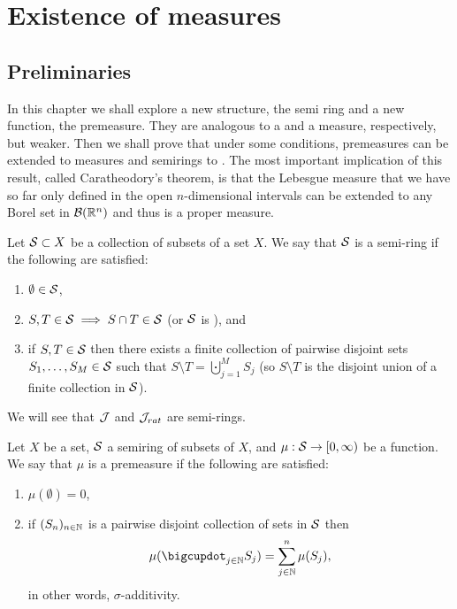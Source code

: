
\chapter{Existence of measures}

\section{Preliminaries}

In this chapter we shall explore a new structure, the semi ring and a new function, the premeasure. They are analogous to a \siga and a measure, respectively, but weaker. Then we shall prove that under some conditions, premeasures can be extended to measures and semirings to \sigas. The most important implication of this result, called Caratheodory's theorem, is that the Lebesgue measure that we have so far only defined in the open $n$-dimensional intervals can be extended to any Borel set in $\mathcal{B}(\mathbb{R}^n)$ and thus is a proper measure.


\begin{dfn}
	Let $\mathcal{S} \subset X$ be a collection of subsets of a set $X$. We say that $\mathcal{S}$ is a semi-ring if the following are satisfied:
	\begin{enumerate}
		\item $\emptyset \in \mathcal{S}$,
		\item $S, T \in \mathcal{S} \implies S \cap T \in \mathcal{S}$ (or $\mathcal{S}$ is \istable), and
		\item if $S, T \in \mathcal{S}$ then there exists a finite collection of pairwise disjoint sets $S_1, \dots, S_M \in \mathcal{S}$ such that $S\setminus T = \bigcupdot_{j = 1}^M S_j$ (so $S\setminus T$ is the disjoint union of a finite collection in $\mathcal{S}$).
	\end{enumerate}
\end{dfn}

We will see that $\mathcal{J}$ and $\mathcal{J}_{rat}$ are semi-rings.

\begin{dfn}[Premeasure]
	Let $X$ be a set, $\mathcal{S}$ a semiring of subsets of $X$, and $\mu: \mathcal{S} \to [0, \infty)$ be a function. We say that $\mu$ is a premeasure if the following are satisfied:
	\begin{enumerate}
		\item $\mu(\emptyset) = 0$,
		\item if $(S_n)_{n \in \mathbb{N}}$ is a pairwise disjoint collection of sets in $\mathcal{S}$ then
		\begin{align*}
			\mu(\bigcupdot_{j \in \N} S_j) = \sum_{j \in \N}^n \mu(S_j),
		\end{align*}
		in other words, $\sigma$-additivity.
	\end{enumerate}
\end{dfn}

